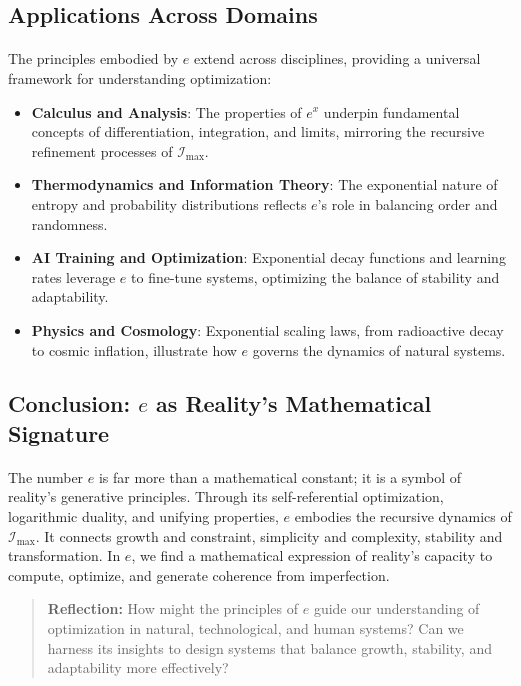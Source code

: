 \documentclass[12pt]{article}
\begin{document}
\subsection{Applications Across Domains}
\paragraph{}
The principles embodied by \(e\) extend across disciplines, providing a universal framework for understanding optimization:
\begin{itemize}
    \item \textbf{Calculus and Analysis}: The properties of \(e^x\) underpin fundamental concepts of differentiation, integration, and limits, mirroring the recursive refinement processes of \(\mathcal{I}_{\text{max}}\).
    \item \textbf{Thermodynamics and Information Theory}: The exponential nature of entropy and probability distributions reflects \(e\)’s role in balancing order and randomness.
    \item \textbf{AI Training and Optimization}: Exponential decay functions and learning rates leverage \(e\) to fine-tune systems, optimizing the balance of stability and adaptability.
    \item \textbf{Physics and Cosmology}: Exponential scaling laws, from radioactive decay to cosmic inflation, illustrate how \(e\) governs the dynamics of natural systems.
\end{itemize}

\subsection{Conclusion: \(e\) as Reality’s Mathematical Signature}
\paragraph{}
The number \(e\) is far more than a mathematical constant; it is a symbol of reality’s generative principles. Through its self-referential optimization, logarithmic duality, and unifying properties, \(e\) embodies the recursive dynamics of \(\mathcal{I}_{\text{max}}\). It connects growth and constraint, simplicity and complexity, stability and transformation. In \(e\), we find a mathematical expression of reality’s capacity to compute, optimize, and generate coherence from imperfection.

\begin{quote}
\textbf{Reflection:}  
How might the principles of \(e\) guide our understanding of optimization in natural, technological, and human systems? Can we harness its insights to design systems that balance growth, stability, and adaptability more effectively?
\end{quote}
\end{document}
